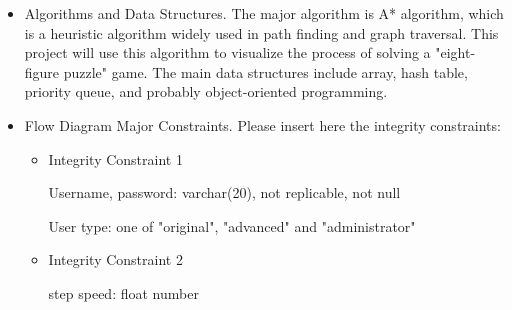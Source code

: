 \begin{itemize}
\item{Algorithms and  Data Structures. }
The major algorithm is A* algorithm, which is a heuristic algorithm widely used in path finding and graph traversal. This project will use this algorithm to visualize the process of solving a "eight-figure puzzle" game.
The main data structures include array, hash table, priority queue, and probably object-oriented programming.
\end{itemize}

\begin{itemize}
\item{  Flow Diagram Major Constraints.}
Please insert here the integrity constraints:
\begin{itemize}
\item{ Integrity Constraint 1 }

Username, password: varchar(20), not replicable, not null

User type: one of "original", "advanced" and "administrator"
\end{itemize}
\begin{itemize}
\item{ Integrity Constraint 2 }

step speed: float number
\end{itemize}
\end{itemize}

